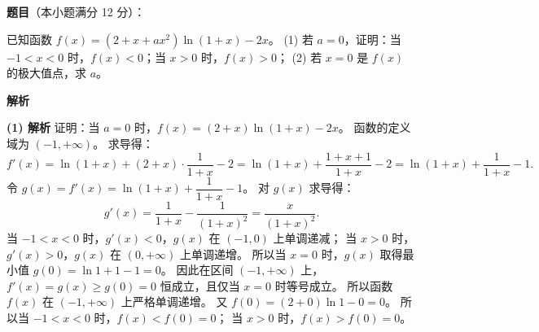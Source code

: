 \begin{answer}


\end{answer}
\begin{answer}

\textbf{题目}（本小题满分 12 分）：

已知函数 $f(x) = (2 + x + ax^2)\ln(1 + x) - 2x$。
(1) 若 $a = 0$，证明：当 $-1 < x < 0$ 时，$f(x) < 0$；当 $x > 0$ 时，$f(x) > 0$；
(2) 若 $x = 0$ 是 $f(x)$ 的极大值点，求 $a$。

\textbf{解析}

\textbf{(1) 解析} 证明：当 $a = 0$ 时，$f(x) = (2 + x)\ln(1 + x) - 2x$。
函数的定义域为 $(-1, +\infty)$。
求导得：
\nopagebreak[4]
\[f'(x) = \ln(1 + x) + (2 + x)\cdot\dfrac{1}{1 + x} - 2 = \ln(1 + x) + \dfrac{1 + x + 1}{1 + x} - 2 = \ln(1 + x) + \dfrac{1}{1 + x} - 1.\]
令 $g(x) = f'(x) = \ln(1 + x) + \dfrac{1}{1 + x} - 1$。
对 $g(x)$ 求导得：
\nopagebreak[4]
\[g'(x) = \dfrac{1}{1 + x} - \dfrac{1}{(1 + x)^2} = \dfrac{x}{(1 + x)^2}.\]
当 $-1 < x < 0$ 时，$g'(x) < 0$，$g(x)$ 在 $(-1, 0)$ 上单调递减；
当 $x > 0$ 时，$g'(x) > 0$，$g(x)$ 在 $(0, +\infty)$ 上单调递增。
所以当 $x = 0$ 时，$g(x)$ 取得最小值 $g(0) = \ln 1 + 1 - 1 = 0$。
因此在区间 $(-1, +\infty)$ 上，$f'(x) = g(x) \geqslant g(0) = 0$ 恒成立，且仅当 $x = 0$ 时等号成立。
所以函数 $f(x)$ 在 $(-1, +\infty)$ 上严格单调递增。
又 $f(0) = (2 + 0)\ln 1 - 0 = 0$。
所以当 $-1 < x < 0$ 时，$f(x) < f(0) = 0$；
当 $x > 0$ 时，$f(x) > f(0) = 0$。


\end{answer}
